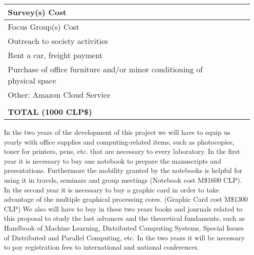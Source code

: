 \documentclass[10pt]{article}
\begin{document}
\begin{center}
\begin{tabular}{|p{324pt}|p{35pt}|p{35pt}|p{35pt}|}
\hline
\parbox{324pt}{\raggedright 
{\small Survey(s) Cost} } 
& \parbox{35pt}{\centering }
& \parbox{35pt}{\centering } 
& \parbox{35pt}{\centering } \\
\hline
\parbox{324pt}{\raggedright 
{\small Focus Group(s) Cost}
} & \parbox{35pt}{\centering } & \parbox{35pt}{\centering }
& \parbox{35pt}{\centering } \\
\hline
\parbox{324pt}{\raggedright 
{\small Outreach to society activities} } 
& \parbox{35pt}{\centering } & \parbox{35pt}{\centering }
& \parbox{35pt}{\centering } \\
\hline
\parbox{324pt}{\raggedright 
{\small Rent a car, freight payment} } 
& \parbox{35pt}{\centering } 
& \parbox{35pt}{\centering } 
& \parbox{35pt}{\centering } \\
\hline
\parbox{324pt}{\raggedright 
{\small Purchase of office furniture and/or minor conditioning of physical space} }
& \parbox{35pt}{\centering }
& \parbox{35pt}{\centering }
& \parbox{35pt}{\centering } \\
\hline
\parbox{324pt}{\raggedright 
{\small Other: Amazon Cloud Service}
} & \parbox{35pt}{\centering }
& \parbox{35pt}{\centering }
& \parbox{35pt}{\centering } \\
\hline
\parbox{324pt}{\raggedright }
& \parbox{35pt}{\centering }
& \parbox{35pt}{\centering }
& \parbox{35pt}{\centering } \\
\hline
\parbox{324pt}{\raggedleft 
\textbf{{\small TOTAL (1000 CLP\$)}} }
& \parbox{35pt}{} 
& \parbox{35pt}{} 
& \parbox{35pt}{\centering } \\
\hline
\end{tabular}
\end{center}

In the two years of the development of this project we will have to equip us yearly with
office supplies and computing-related items, such as photocopies, toner for printers, pens, etc.
that are necessary to every laboratory. In the first year it is necessary to buy  one notebook to prepare the manuscripts and presentations. Furthermore the mobility granted by the notebooks is helpful for using it in travels, seminars and group meetings (Notebook cost M\$1600 CLP).
In the second year it is necessary to buy a graphic card in order to take advantage of the multiple graphical processing cores. (Graphic Card cost M\$1300 CLP)
We also will have to buy in these two years books and journals related to this proposal to study the last advances and the theoretical fundaments, such as Handbook of Machine Learning, Distributed Computing Systems, Special Issues of Distributed and Parallel Computing, etc.
In the two years it will be necessary to pay registration fees to international and national conferences. 
\end{document}
